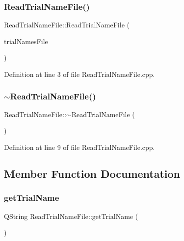 \subsubsection{\texorpdfstring{Read\+Trial\+Name\+File()}{ReadTrialNameFile()}}
{\footnotesize\ttfamily Read\+Trial\+Name\+File\+::\+Read\+Trial\+Name\+File (\begin{DoxyParamCaption}\item[{Q\+String}]{trial\+Names\+File }\end{DoxyParamCaption})}



Definition at line 3 of file Read\+Trial\+Name\+File.\+cpp.

\mbox{\label{class_read_trial_name_file_a3a8ef50b5d6b5a7a7b78133013ed020b}} 
\subsubsection{\texorpdfstring{$\sim$\+Read\+Trial\+Name\+File()}{~ReadTrialNameFile()}}
{\footnotesize\ttfamily Read\+Trial\+Name\+File\+::$\sim$\+Read\+Trial\+Name\+File (\begin{DoxyParamCaption}{ }\end{DoxyParamCaption})}



Definition at line 9 of file Read\+Trial\+Name\+File.\+cpp.



\subsection{Member Function Documentation}
\mbox{\label{class_read_trial_name_file_ac2baefe73463ab4de88b3bc4ab0fbc23}} 
\subsubsection{\texorpdfstring{get\+Trial\+Name}{getTrialName}}
{\footnotesize\ttfamily Q\+String Read\+Trial\+Name\+File\+::get\+Trial\+Name (\begin{DoxyParamCaption}{ }\end{DoxyParamCaption})\hspace{0.3cm}{\ttfamily [slot]}}



